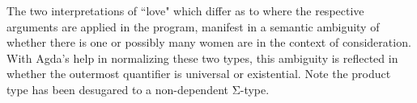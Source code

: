 The two interpretations of ``love" which differ as to where the respective
arguments are applied in the program, manifest in a semantic ambiguity of
whether there is one or possibly many women are in the context of consideration.
With Agda's help in normalizing these two types, this ambiguity is reflected in
whether the outermost quantifier is universal or existential. Note the product
type has been desugared to a non-dependent Σ-type.

\begin{code}%
\>[0]\AgdaSymbol{(}\AgdaSymbol{)}%
\>[5]\AgdaSymbol{=}\AgdaSpace{}%
\AgdaSymbol{(}\AgdaSpace{}%
\AgdaSymbol{:}\AgdaSpace{}%
\AgdaSymbol{)}\AgdaSpace{}%
\AgdaSpace{}%
\AgdaSpace{}%
\AgdaSpace{}%
\AgdaSpace{}%
\AgdaSpace{}%
\AgdaSpace{}%
\AgdaSpace{}%
\AgdaSpace{}%
\AgdaSpace{}%
\AgdaSpace{}%
\AgdaSymbol{(}\AgdaSpace{}%
\AgdaSymbol{)}\AgdaSpace{}%
\AgdaSpace{}%
\AgdaSpace{}%
\AgdaSpace{}%
\AgdaSpace{}%
\AgdaSpace{}%
\AgdaSymbol{))}\<%
\\
\>[0]\AgdaSymbol{(}\AgdaSymbol{)}\AgdaSpace{}%
\AgdaSymbol{=}\AgdaSpace{}%
\AgdaSpace{}%
\AgdaSpace{}%
\AgdaSpace{}%
\AgdaSpace{}%
\AgdaSpace{}%
\AgdaSpace{}%
\AgdaSymbol{(}\AgdaSpace{}%
\AgdaSymbol{)}\AgdaSpace{}%
\AgdaSpace{}%
\AgdaSpace{}%
\AgdaSpace{}%
\AgdaSymbol{(}\AgdaSpace{}%
\AgdaSymbol{:}\AgdaSpace{}%
\AgdaSymbol{)}\AgdaSpace{}%
\AgdaSpace{}%
\AgdaSpace{}%
\AgdaSpace{}%
\AgdaSpace{}%
\AgdaSpace{}%
\AgdaSpace{}%
\AgdaSymbol{))}\<%
\end{code}

